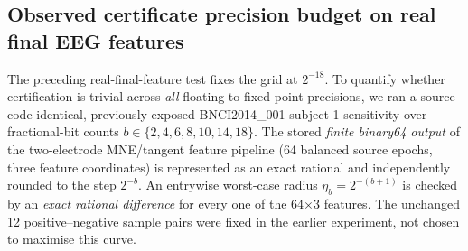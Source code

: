 \subsection{Observed certificate precision budget on real final EEG features}
\label{sec:p4-real-feature-precision-curve}
The preceding real-final-feature test fixes the grid at
$2^{-18}$. To quantify whether certification is trivial
across \emph{all} floating-to-fixed point precisions,
we ran a source-code-identical, previously exposed
BNCI2014\_001 subject 1 sensitivity over
fractional-bit counts
$b\in\{2,4,6,8,10,14,18\}$.
The stored \emph{finite binary64 output} of the
two-electrode MNE/tangent feature pipeline
(64 balanced source epochs, three feature
coordinates) is represented as an exact rational
and independently rounded to the step $2^{-b}$.
An entrywise worst-case radius
$\eta_b=2^{-(b+1)}$ is checked by
an \emph{exact rational difference} for every
one of the 64$\times$3 features.
The unchanged 12 positive--negative sample pairs
were fixed in the earlier experiment, not
chosen to maximise this curve.

